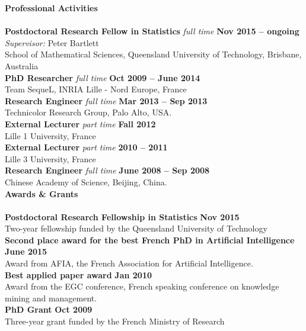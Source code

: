 \noindent\textbf{Professional Activities}\\[-.4cm]\noindent\makebox[\linewidth]{\rule{\columnwidth}{0.4pt}}\\[.1cm]
\noindent\textbf{Postdoctoral Research Fellow in Statistics} \textit{full time } \hfill \textbf{Nov 2015 -- ongoing} \\
\textit{Supervisor:} Peter Bartlett\\
School of Mathematical Sciences, Queensland University of Technology, Brisbane, Australia\\
\noindent\textbf{PhD Researcher} \textit{full time } \hfill \textbf{Oct 2009 -- June 2014}\\
Team SequeL, INRIA Lille - Nord Europe, France\\
\textbf{Research Engineer}  \textit{full time }  \hfill \textbf{ Mar 2013 -- Sep 2013}\\
Technicolor Research Group, Palo Alto, USA.\\
\textbf{External Lecturer} \textit{part time } \hfill \textbf{ Fall 2012}\\
Lille 1 University, France\\
\textbf{External Lecturer} \textit{part time }\hfill \textbf{2010 -- 2011  }\\
Lille 3 University, France\\ 
\textbf{Research Engineer}  \textit{full time }  \hfill \textbf{ June 2008 -- Sep 2008}\\
Chinese Academy of Science, Beijing, China.\\[.2cm] 

\noindent\textbf{Awards \& Grants}\\[-.4cm]\noindent\makebox[\linewidth]{\rule{\columnwidth}{0.4pt}}\\[.1cm]
\noindent\textbf{Postdoctoral Research Fellowship in Statistics} \hfill \textbf{Nov 2015} \\
Two-year fellowship funded by the Queensland University of Technology\\
\noindent\textbf{Second place award for the best French PhD in Artificial Intelligence }  \hfill \textbf{June 2015}\\
Award from AFIA, the French Association for Artificial Intelligence.\\
\textbf{Best applied paper award}  \hfill \textbf{ Jan 2010}\\
Award from the EGC conference, French speaking conference on knowledge mining and management.\\
\textbf{PhD Grant}  \hfill \textbf{ Oct 2009}\\
Three-year grant funded by the French Ministry of Research\\[.2cm]

